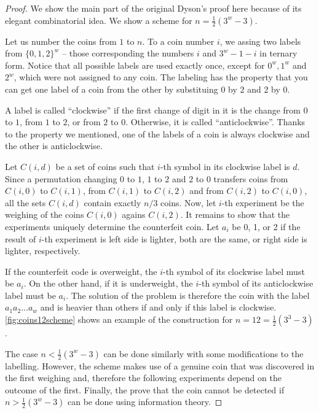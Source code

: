 \begin{proof}
We show the main part of the original Dyson's proof\cite{coins-dyson1946}
  here because of its elegant combinatorial idea.
We show a scheme for $n = \frac{1}{2}(3^w - 3)$.

Let us number the coins from $1$ to $n$.
To a coin number $i$, we assing
  two labels from $\{0,1,2\}^w$ -- those corresponding the numbers
  $i$ and $3^w - 1 - i$ in ternary form.
Notice that all possible labels are used exactly once, except for $0^w, 1^w$
  and $2^w$, which were not assigned to any coin.
The labeling has the property that you can
  get one label of a coin from the other by substituing $0$ by $2$ and $2$ by $0$.

A label is called ``clockwise'' if the first change of digit in it is
the change from $0$ to $1$, from $1$ to $2$, or from $2$ to $0$.
Otherwise, it is called ``anticlockwise''.
Thanks to the property we mentioned, one of the labels of a coin is always
  clockwise and the other is anticlockwise.

Let $C(i, d)$ be a set of coins such that $i$-th symbol in
  its clockwise label is $d$.
Since a permutation changing $0$ to $1$, $1$ to $2$ and $2$ to $0$ transfers
  coins from $C(i,0)$ to $C(i,1)$,
        from $C(i,1)$ to $C(i,2)$ and
        from $C(i,2)$ to $C(i,0)$,
  all the sets $C(i, d)$ contain exactly $n/3$ coins.
Now, let $i$-th experiment be the weighing of the coins $C(i,0)$ agains $C(i, 2)$.
It remains to show that the experiments uniquely determine the counterfeit coin.
Let $a_i$ be 0, 1, or 2 if the result of $i$-th experiment is
  left side is lighter, both are the same, or right side is lighter, respectively.

If the counterfeit code is overweight, the $i$-th symbol of its clockwise label
  must be $a_i$. On the other hand, if it is underweight, the $i$-th symbol of
  its anticlockwise label must be $a_i$.
The solution of the problem is therefore the coin with the label $a_1a_2...a_w$
  and is heavier than others if and only if this label is clockwise.
\autoref{fig:coins12scheme} shows an example of the construction for $n = 12 = \frac{1}{2}(3^3 - 3)$.

The case $n < \frac{1}{2}(3^w - 3)$ can be done similarly with some modifications
  to the labelling.
However, the scheme makes use of a genuine coin that was discovered in the first
  weighing and, therefore the following experiments depend on the outcome of
  the first.
Finally, the prove that the coin cannot be detected if
  $n > \frac{1}{2}(3^w - 3)$ can be done using information theory.


\end{proof}
